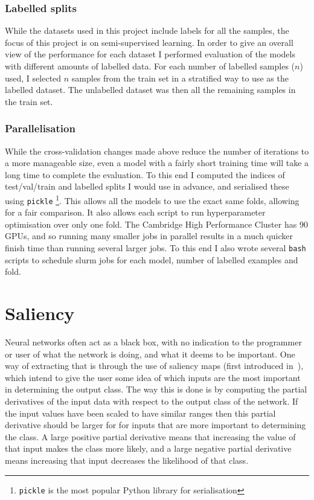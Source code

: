 \subsubsection{Labelled splits}
While the datasets used in this project include labels for all the samples, the focus of this project is on semi-supervised learning.
In order to give an overall view of the performance for each dataset I performed evaluation of the models with different amounts of
labelled data. For each number of labelled samples ($n$) used, I selected $n$ samples from the train set in a stratified way to use as the 
labelled dataset. The unlabelled dataset was then all the remaining samples in the train set.

\subsubsection{Parallelisation}
While the cross-validation changes made above reduce the number of iterations to a more manageable size, even a model with a fairly short 
training time will take a long time to complete the evaluation. To this end I computed the indices of test/val/train and labelled 
splits I would use in advance, and serialised these using \texttt{pickle} \footnote{\texttt{pickle} is the most popular Python library 
for serialisation}. This allows all the models to use the exact same folds, allowing
for a fair comparison. It also allows each script to run hyperparameter optimisation over only one fold. The Cambridge High Performance
Cluster has 90 GPUs, and so running many smaller jobs in parallel results in a much quicker finish time than running several larger jobs.
To this end I also wrote several \texttt{bash} scripts to schedule slurm jobs for each model, number of labelled examples and fold. 

\section{Saliency} \label{saliency}
Neural networks often act as a black box, with no indication to the programmer or user of what the network is doing, and what it deems 
to be important. One way of extracting that is through the use of saliency maps (first introduced in~\cite{DBLP:journals/corr/SimonyanVZ13}), 
which intend to give the user some idea of which inputs 
are the most important in determining the output class. The way this is done is by computing the partial derivatives of the input data 
with respect to the output class of the network. If the input values have been scaled to have similar ranges then this partial derivative
should be larger for for inputs that are more important to determining the class. A large positive partial derivative means that increasing 
the value of that input makes the class more likely, and a large negative partial derivative means increasing that input decreases the 
likelihood of that class.

